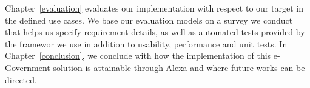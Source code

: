 Chapter~\ref{evaluation} evaluates our implementation with respect to our target in the defined %
use cases. We base our evaluation models on a survey we conduct that helps us specify requirement details, as well as automated tests provided by the framewor we use in addition to usability, performance and unit tests. 
In Chapter~\ref{conclusion}, we conclude with how the implementation of this e-Government solution is attainable through Alexa and where future works can be directed. 
